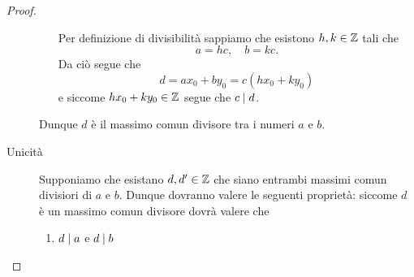 \begin{proof}
\begin{description}
\begin{enumerate}[label={(\roman*)}]
            Per definizione di divisibilità sappiamo che esistono $h, k \in \mathbb{Z}$ tali che \[
                a = hc, \quad b = kc.    
            \] Da ciò segue che \[
                d = ax_0 + by_0 = c(hx_0 + ky_0)    
            \] e siccome $hx_0 + ky_0 \in \mathbb{Z}$ segue che $c \mid d$.
        \end{enumerate}
        Dunque $d$ è il massimo comun divisore tra i numeri $a$ e $b$.
        \item[Unicità] Supponiamo che esistano $d, d^\prime \in \mathbb{Z}$ che siano entrambi massimi comun divisiori di $a$ e $b$. Dunque dovranno valere le seguenti proprietà: siccome $d$ è un massimo comun divisore dovrà valere che \begin{enumerate}[label={(\roman*)}]
            \item $d \mid a$ e $d \mid b$
        \end{enumerate}
    \end{description}
\end{proof}